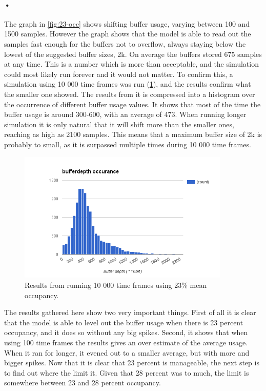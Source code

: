 \documentclass[a4paper, 12pt, openright, twoside]{report}
\begin{document}
\paragraph{•}
The graph in \ref{fig:23-occ} shows shifting buffer usage, varying between 100 and 1500 samples.
However the graph shows that the model is able to read out the samples fast enough for the buffers not to overflow, always staying below the lowest of the suggested buffer sizes, 2k.
On average the buffers stored 675 samples at any time.
This is a number which is more than acceptable, and the simulation could most likely run forever and it would not matter.
To confirm this, a simulation using 10 000 time frames was run (\ref{fig:10k-23-occ}), and the results confirm what the smaller one showed.
The results from it is compressed into a histogram over the occurrence of different buffer usage values.
It shows that most of the time the buffer usage is around 300-600, with an average of 473.
When running longer simulation it is only natural that it will shift more than the smaller ones, reaching as high as 2100 samples.
This means that a maximum buffer size of 2k is probably to small, as it is surpassed multiple times during 10 000 time frames.

\begin{figure}[h!]
	\centering
		\includegraphics[width=0.9\textwidth]{images/10k-23-occ.png}
		\caption{Results from running 10 000 time frames using 23\% mean occupancy.}
		\label{fig:10k-23-occ}
\end{figure}

The results gathered here show two very important things.
First of all it is clear that the model is able to level out the buffer usage when there is 23 percent occupancy, and it does so without any big spikes.
Second, it shows that when using 100 time frames the results gives an over estimate of the average usage.
When it ran for longer, it evened out to a smaller average, but with more and bigger spikes.
Now that it is clear that 23 percent is manageable, the next step is to find out where the limit it.
Given that 28 percent was to much, the limit is somewhere between 23 and 28 percent occupancy.
\end{document}
